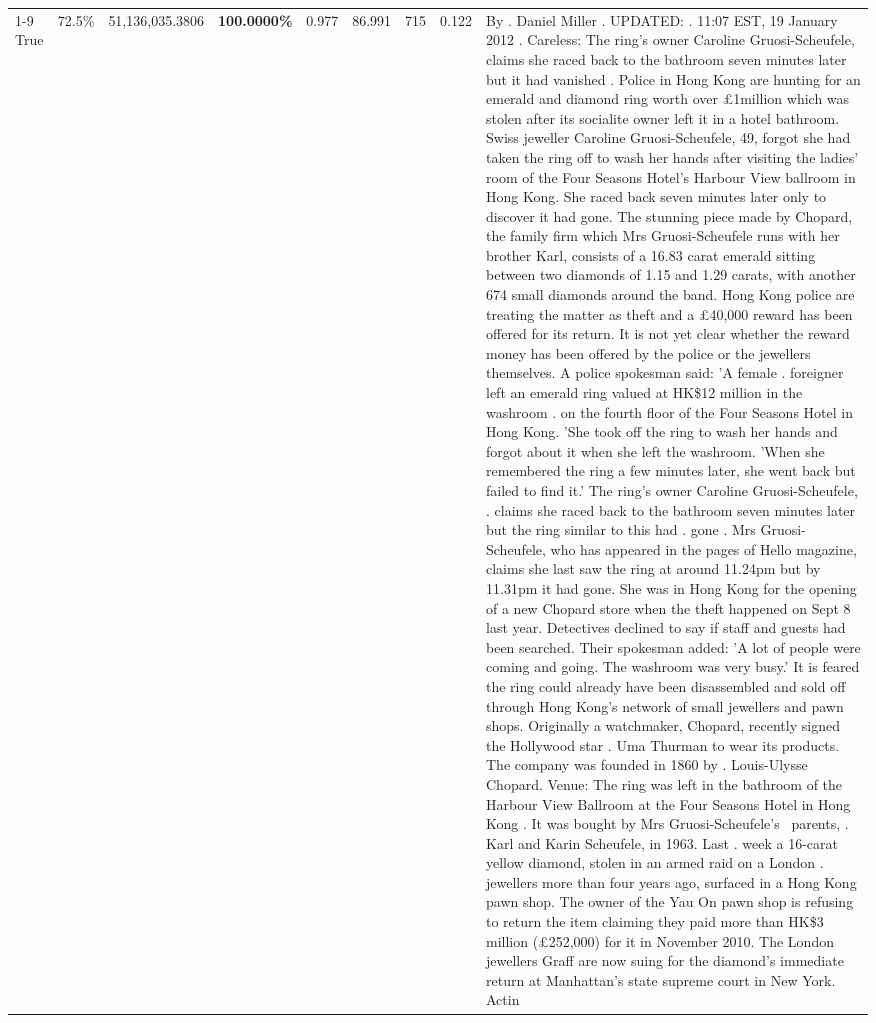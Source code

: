 \begin{table}[H]
\begin{tabular}{lllrlllll}
\cline{1-9} \cline{2-9}
True & 72.5\% & 51,136,035.3806 & \bfseries \color{red} 100.0000\% & 0.977 & 86.991 & 715 & 0.122 & By . Daniel Miller . UPDATED: . 11:07 EST, 19 January 2012 . Careless: The ring's owner Caroline Gruosi-Scheufele, claims she raced back to the bathroom seven minutes later but it had vanished . Police in Hong Kong are hunting for an emerald and diamond ring worth over £1million which was stolen after its socialite owner left it in a hotel bathroom. Swiss jeweller Caroline Gruosi-Scheufele, 49, forgot she had taken the ring off to wash her hands after visiting the ladies' room of the Four Seasons Hotel's Harbour View ballroom in Hong Kong. She raced back seven minutes later only to discover it had gone. The stunning piece made by Chopard, the family firm which Mrs Gruosi-Scheufele runs with her brother Karl, consists of a 16.83 carat emerald sitting between two diamonds of 1.15 and 1.29 carats, with another 674 small diamonds around the band. Hong Kong police are treating the matter as theft and a £40,000 reward has been offered for its return. It is not yet clear whether the reward money has been offered by the police or the jewellers themselves. A police spokesman said: 'A female . foreigner left an emerald ring valued at HK\$12 million in the washroom . on the fourth floor of the Four Seasons Hotel in Hong Kong. 'She took off the ring to wash her hands and forgot about it when she left the washroom. 'When she remembered the ring a few minutes later, she went back but failed to find it.' The ring's owner Caroline Gruosi-Scheufele, . claims she raced back to the bathroom seven minutes later but the ring similar to this had . gone . Mrs Gruosi-Scheufele, who has appeared in the pages of Hello magazine, claims she last saw the ring at around 11.24pm but by 11.31pm it had gone. She was in Hong Kong for the opening of a new Chopard store when the theft happened on Sept 8 last year. Detectives declined to say if staff and guests had been searched. Their spokesman added: 'A lot of people were coming and going. The washroom was very busy.' It is feared the ring could already have been disassembled and sold off through Hong Kong's network of small jewellers and pawn shops. Originally a watchmaker, Chopard, recently signed the Hollywood star . Uma Thurman to wear its products. The company was founded in 1860 by . Louis-Ulysse Chopard. Venue: The ring was left in the bathroom of the Harbour View Ballroom at the Four Seasons Hotel in Hong Kong . It was bought by Mrs Gruosi-Scheufele's  parents, . Karl and Karin Scheufele, in 1963. Last . week a 16-carat yellow diamond, stolen in an armed raid on a London . jewellers more than four years ago, surfaced in a Hong Kong pawn shop. The owner of the Yau On pawn shop is refusing to return the item claiming they paid more than HK\$3 million (£252,000) for it in November 2010. The London jewellers Graff are now suing for the diamond’s immediate return at Manhattan’s state supreme court in New York. Actin \\

\end{tabular}
\end{table}
